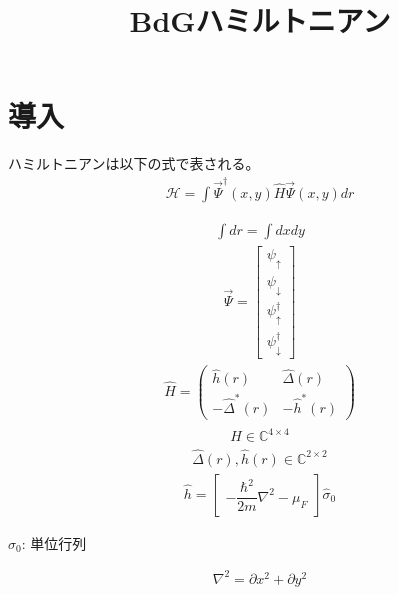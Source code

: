 \documentclass{jarticle}
\begin{document}
\title{BdGハミルトニアン}
\maketitle

\tableofcontents
\newpage
\section{導入}

ハミルトニアンは以下の式で表される。
\begin{align}
\mathcal{H}=\int\vec{\Psi}^\dagger(x,y)\hat{H}\vec{\Psi}(x,y)dr
\end{align}

\begin{align}
\int{dr}=\int{dxdy}
\end{align}
\begin{align}
\vec{\Psi}=\begin{bmatrix}
\psi_{\uparrow} \\
\psi_{\downarrow} \\
\psi_{\uparrow}^\dagger \\
\psi_{\downarrow}^\dagger
\end{bmatrix}
\end{align}
\begin{align}
\hat{H}=
\begin{pmatrix}
	\hat{h}(r) & \hat{\Delta}(r) \\
	-\hat{\Delta}^{*}(r) & -\hat{h}^{*}(r)
\end{pmatrix}
\end{align}
\begin{align}
\hat{H}\in\mathbb{C}^{4\times 4}
\end{align}
\begin{align}
\hat{\Delta}(r),\hat{h}(r)\in\mathbb{C}^{2\times 2}
\end{align}
\begin{align}
\hat{h}=
\begin{bmatrix}
-\dfrac{\hbar^2}{2m}\nabla^2-\mu_F
\end{bmatrix}
\hat{\sigma}_0
\end{align}
\begin{flushright}
$\hat{\sigma}_0$: 単位行列
\end{flushright}
\begin{align}
\nabla^2=\partial x^2+\partial y^2
\end{align}
\end{document}
